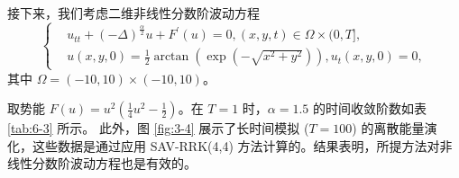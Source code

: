 		\begin{example}\label{ex:3}
			接下来，我们考虑二维非线性分数阶波动方程
			\begin{equation}
			\begin{cases}
			& u_{t t}+(-\Delta)^{\frac{\alpha}{2}} u+F^{\prime}(u)=0,(x, y, t) \in \Omega \times(0, T],\\
			& u(x, y, 0)=\frac{1}{2} \arctan \left(\exp \left(-\sqrt{x^2+y^2}\right)\right), u_t(x, y, 0)=0,
			\end{cases}
			\end{equation}
			其中 $\Omega=(-10,10) \times(-10,10)$。
			\end{example}
			
			取势能 $F(u)=u^2\left(\frac{1}{4} u^2-\frac{1}{2}\right)$。在 $T=1$ 时，$\alpha=1.5$ 的时间收敛阶数如表 \ref{tab:6-3} 所示。
			此外，图 \ref{fig:3-4} 展示了长时间模拟 ($T=100$) 的离散能量演化，这些数据是通过应用 SAV-RRK(4,4) 方法计算的。结果表明，所提方法对非线性分数阶波动方程也是有效的。
			
